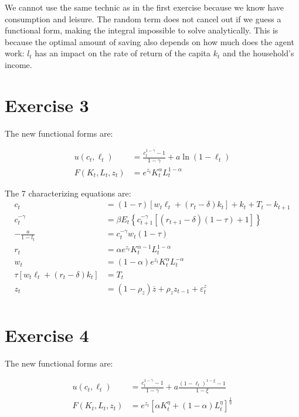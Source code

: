 \documentclass[11pt]{article}
\numberwithin{equation}{section}
\theoremstyle{plain}
\theoremstyle{definition}
\newcommand{\1}{\mathbbm 1}
\def\a{\alpha}
\def\g{\gamma}
\newcommand{\e}{\varepsilon}
\begin{document}
We cannot use the same technic as in the first exercise because we know have consumption and leisure. The random term does not cancel out if we guess a functional form, making the integral impossible to solve analytically. This is because the optimal amount of saving also depends on how much does the agent work: $l_t$ has an impact on the rate of return of the capita $k_t$ and the household's income.


\section*{Exercise 3}
The new functional forms are:

\begin{align} 
u\left(c_{t}, \ell_{t}\right) &=\frac{c_{t}^{1-\gamma}-1}{1-\gamma}+a \ln \left(1-\ell_{t}\right) \\ 
F\left(K_{t}, L_{t}, z_{t}\right) &=e^{z_{t}} K_{t}^{\alpha} L_{t}^{1-\alpha} \end{align}

The 7 characterizing equations are:
\begin{align}
c_{t}&=(1-\tau)\left[w_{t} \ell_{t}+\left(r_{t}-\delta\right) k_{t}\right]+k_{t}+T_{t}-k_{t+1} \\
c_t^{-\g}&=\beta E_{t}\left\{c_{t+1}^{-\g}\left[\left(r_{t+1}-\delta\right)(1-\tau)+1\right]\right\} \\
-\frac{a}{1-l_t}&=c_t^{-\g} w_{t}(1-\tau) \\
r_{t}&=\a e^{z_{t}} K_{t}^{\alpha-1} L_{t}^{1-\alpha} \\
w_{t}&=(1 - \a) e^{z_{t}} K_{t}^{\alpha} L_{t}^{-\alpha} \\
\tau\left[w_{t} \ell_{t}+\left(r_{t}-\delta\right) k_{t}\right]&=T_{t}\\
z_t&= (1 - \rho_z) \overline{z} + \rho_z z_{t-1} + \e_t^{z}\\
\end{align}

\section*{Exercise 4}
The new functional forms are:

\begin{align} 
 u\left(c_{t}, \ell_{t}\right) &=\frac{c_{t}^{1-\gamma}-1}{1-\gamma}+a \frac{\left(1-\ell_{t}\right)^{1-\xi}-1}{1-\xi} \\ F\left(K_{t}, L_{t}, z_{t}\right) &=e^{z_{t}}\left[\alpha K_{t}^{\eta}+(1-\alpha) L_{t}^{\eta}\right]^{\frac{1}{\eta}} 
 \end{align}
\end{document}
